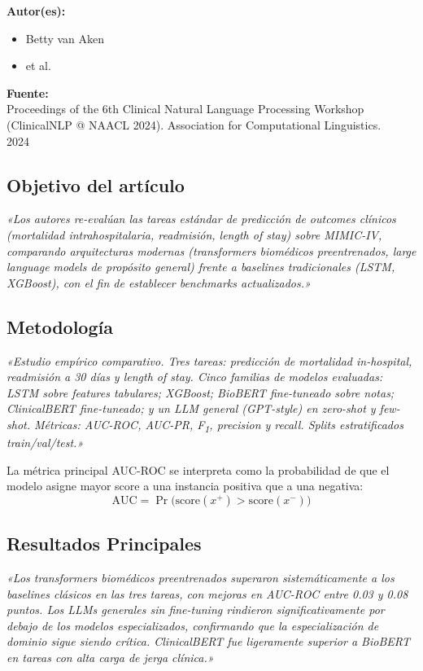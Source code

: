 \documentclass[11pt,a4paper]{article}
\newcommand{\cita}[1]{{\color{navy}\textit{«#1»}}}
\begin{document}
\textbf{Autor(es):}
\begin{itemize}
  \item Betty van Aken
  \item et al.
\end{itemize}

\textbf{Fuente:}\\
Proceedings of the 6th Clinical Natural Language Processing Workshop (ClinicalNLP @ NAACL 2024). Association for Computational Linguistics.\\
2024

\subsection{Objetivo del artículo}
\cita{Los autores re-evalúan las tareas estándar de predicción de outcomes clínicos (mortalidad intrahospitalaria, readmisión, length of stay) sobre MIMIC-IV, comparando arquitecturas modernas (transformers biomédicos preentrenados, large language models de propósito general) frente a baselines tradicionales (LSTM, XGBoost), con el fin de establecer benchmarks actualizados.}

\subsection{Metodología}
\cita{Estudio empírico comparativo. Tres tareas: predicción de mortalidad in-hospital, readmisión a 30 días y length of stay. Cinco familias de modelos evaluadas: LSTM sobre features tabulares; XGBoost; BioBERT fine-tuneado sobre notas; ClinicalBERT fine-tuneado; y un LLM general (GPT-style) en zero-shot y few-shot. Métricas: AUC-ROC, AUC-PR, F\textsubscript{1}, precision y recall. Splits estratificados train/val/test.}

La métrica principal AUC-ROC se interpreta como la probabilidad de que el modelo asigne mayor score a una instancia positiva que a una negativa:
\begin{equation}
\mathrm{AUC} = \Pr\bigl(\mathrm{score}(x^{+}) > \mathrm{score}(x^{-})\bigr)
\end{equation}

\subsection{Resultados Principales}
\cita{Los transformers biomédicos preentrenados superaron sistemáticamente a los baselines clásicos en las tres tareas, con mejoras en AUC-ROC entre 0.03 y 0.08 puntos. Los LLMs generales sin fine-tuning rindieron significativamente por debajo de los modelos especializados, confirmando que la especialización de dominio sigue siendo crítica. ClinicalBERT fue ligeramente superior a BioBERT en tareas con alta carga de jerga clínica.}
\end{document}

